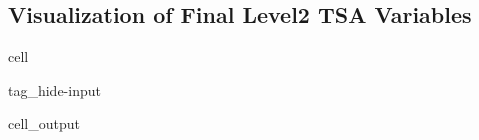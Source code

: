 \documentclass[letterpaper,10pt,english]{jupyterBook}
\begin{document}
\subsection{Visualization of Final Level\sphinxhyphen{}2 TSA Variables}
\label{\detokenize{algorithm/CIMR_L2_TSA_PICASSO:visualization-of-final-level-2-tsa-variables}}
\begin{sphinxuseclass}{cell}
\begin{sphinxuseclass}{tag_hide-input}\begin{sphinxVerbatimOutput}

\begin{sphinxuseclass}{cell_output}
\noindent{}

\end{sphinxuseclass}\end{sphinxVerbatimOutput}

\end{sphinxuseclass}
\end{sphinxuseclass}
\sphinxstepscope
\end{document}
